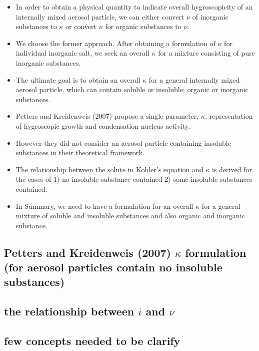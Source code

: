 \documentclass[12pt]{article}
\begin{document}
\begin{itemize}
\item In order to obtain a physical quantity to indicate overall hygroscopicity of an internally mixed aerosol particle, we can either convert $\nu$ of inorganic substances to $\kappa$ or convert $\kappa$ for organic substances to $\nu$. 


\item We choose the former approach. After obtaining a formulation of $\kappa$ for individual inorganic salt, we seek an overall $\kappa$ for a mixture consisting of pure inorganic substances. 

\item The ultimate goal is to obtain an overall $\kappa$ for a general internally mixed aerosol particle, which can contain soluble or insoluble; organic or inorganic substances.

\item Petters and Kreidenweis (2007) propose a single parameter, $\kappa$, representation of hygroscopic growth and condensation nucleus activity.

\item However they did not consider an aerosol particle containing insoluble substances in their theoretical framework.

\item The relationship between the solute in Kohler's equation and $\kappa$ is derived for the cases of 1) no insoluble substance contained 2) some insoluble substances contained.  

\item In Summary, we need to have a formulation for an overall $\kappa$ for a general mixture of soluble and insoluble substances and also organic and inorganic substance. 
 
\end{itemize}
 
\subsection{Petters and Kreidenweis (2007) $\kappa$ formulation (for aerosol particles contain no insoluble substances)}


\subsection{the relationship between $i$ and $\nu$}

\subsection{few concepts needed to be clarify}
\end{document}
